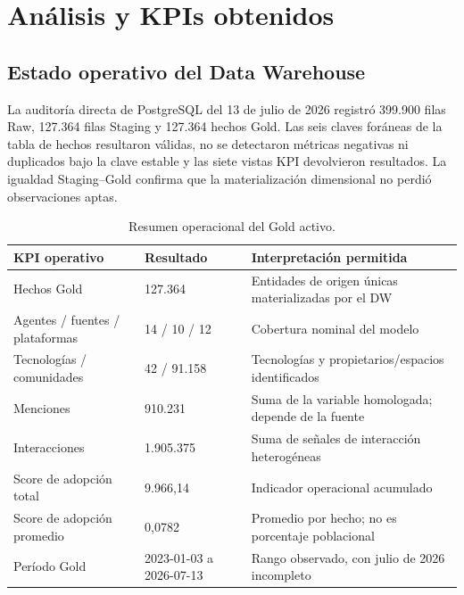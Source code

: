 \documentclass[12pt,a4paper]{article}
\begin{document}
\section{Análisis y KPIs obtenidos}

\subsection{Estado operativo del Data Warehouse}

La auditoría directa de PostgreSQL del 13 de julio de 2026 registró 399.900 filas Raw, 127.364 filas Staging y 127.364 hechos Gold. Las seis claves foráneas de la tabla de hechos resultaron válidas, no se detectaron métricas negativas ni duplicados bajo la clave estable y las siete vistas KPI devolvieron resultados. La igualdad Staging--Gold confirma que la materialización dimensional no perdió observaciones aptas.

\begin{table}[H]
\centering
\small
{}
\begin{tabularx}{\textwidth}{Y P{3.2cm} Y}
\toprule
{}
\textbf{KPI operativo} & \textbf{Resultado} & \textbf{Interpretación permitida} \\
\midrule
Hechos Gold & 127.364 & Entidades de origen únicas materializadas por el DW \\
Agentes / fuentes / plataformas & 14 / 10 / 12 & Cobertura nominal del modelo \\
Tecnologías / comunidades & 42 / 91.158 & Tecnologías y propietarios/espacios identificados \\
Menciones & 910.231 & Suma de la variable homologada; depende de la fuente \\
Interacciones & 1.905.375 & Suma de señales de interacción heterogéneas \\
Score de adopción total & 9.966,14 & Indicador operacional acumulado \\
Score de adopción promedio & 0,0782 & Promedio por hecho; no es porcentaje poblacional \\
Período Gold & 2023-01-03 a 2026-07-13 & Rango observado, con julio de 2026 incompleto \\
\bottomrule
\end{tabularx}
\caption{Resumen operacional del Gold activo.}
\label{tab:operativos}
\end{table}
\end{document}
